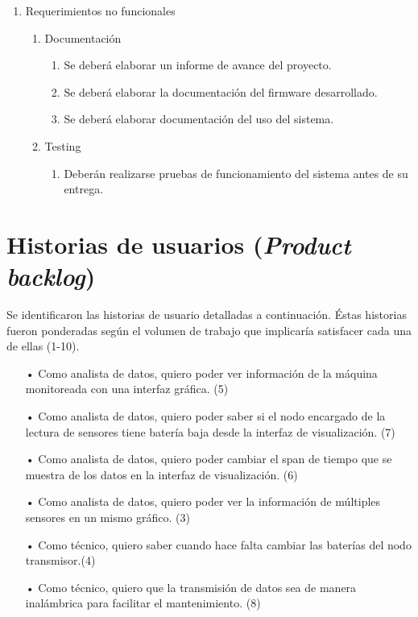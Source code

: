 \documentclass[11pt]{charter}
\begin{document}
\begin{enumerate}
\item Requerimientos no funcionales
	\begin{enumerate}
	\item Documentación
		\begin{enumerate}[label*=\arabic*.]
		\item Se deberá elaborar un informe de avance del proyecto.
		\item Se deberá elaborar la documentación del firmware desarrollado.
		\item Se deberá elaborar documentación del uso del sistema.
		\end{enumerate}
	\item Testing
		\begin{enumerate}[label*=\arabic*.]
		\item Deberán realizarse pruebas de funcionamiento del sistema antes de su entrega.
		\end{enumerate}
	\end{enumerate}
\end{enumerate}


\section{Historias de usuarios (\textit{Product backlog})}
\label{sec:backlog}

Se identificaron las historias de usuario detalladas a continuación. Éstas historias fueron ponderadas según el volumen de trabajo que implicaría satisfacer cada una de ellas (1-10).
  
\begin{itemize}
\item[•] Como analista de datos, quiero poder ver información de la máquina monitoreada con una interfaz gráfica. (5)
\item[•] Como analista de datos, quiero poder saber si el nodo encargado de la lectura de sensores tiene batería baja desde la interfaz de visualización. (7)
\item[•] Como analista de datos, quiero poder cambiar el span de tiempo que se muestra de los datos en la interfaz de visualización. (6)
\item[•] Como analista de datos, quiero poder ver la información de múltiples sensores en un mismo gráfico. (3)
\item[•] Como técnico, quiero saber cuando hace falta cambiar las baterías del nodo transmisor.(4)
\item[•] Como técnico, quiero que la transmisión de datos sea de manera inalámbrica para facilitar el mantenimiento. (8)
\end{itemize}
\end{document}
